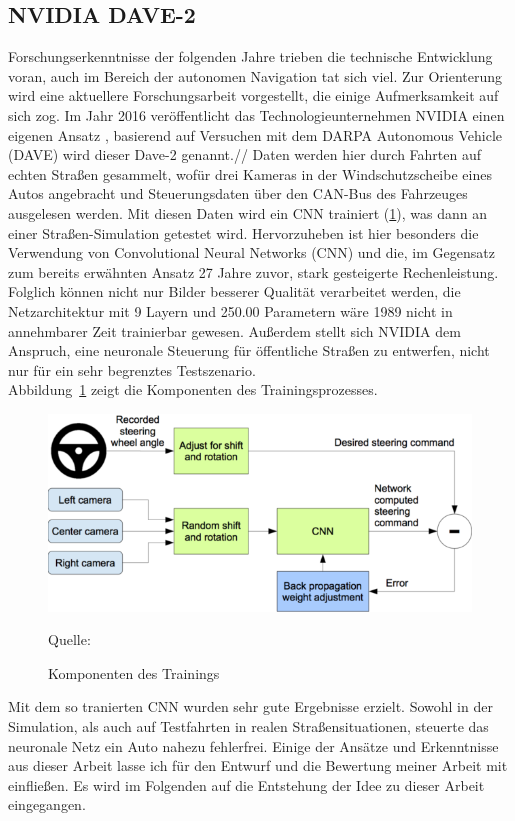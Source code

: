 \subsection{NVIDIA DAVE-2}

Forschungserkenntnisse der folgenden Jahre trieben die technische Entwicklung voran, auch im Bereich der autonomen Navigation tat sich viel. Zur Orienterung wird eine aktuellere Forschungsarbeit vorgestellt, die einige Aufmerksamkeit auf sich zog.
Im Jahr 2016 veröffentlicht das Technologieunternehmen \textsc{NVIDIA} einen eigenen Ansatz \cite{bojarski2016end}, basierend auf Versuchen mit dem \glqq DARPA Autonomous Vehicle \grqq{} (DAVE)  wird dieser \glqq Dave-2 \grqq{} genannt.//
Daten werden hier durch Fahrten auf echten Straßen gesammelt, wofür drei Kameras in der Windschutzscheibe eines Autos angebracht und Steuerungsdaten über den CAN-Bus des Fahrzeuges ausgelesen werden. Mit diesen Daten wird ein CNN trainiert (\ref{img:NVIDIA}), was dann an einer Straßen-Simulation getestet wird. Hervorzuheben ist hier besonders die Verwendung von Convolutional Neural Networks (CNN) und die, im Gegensatz zum bereits erwähnten Ansatz 27 Jahre zuvor, stark gesteigerte Rechenleistung. Folglich können nicht nur Bilder besserer Qualität verarbeitet werden, die Netzarchitektur mit 9 Layern und 250.00 Parametern wäre 1989 nicht in annehmbarer Zeit trainierbar gewesen. Außerdem stellt sich NVIDIA dem Anspruch, eine neuronale Steuerung für öffentliche Straßen zu entwerfen, nicht nur für ein sehr begrenztes Testszenario.\\
Abbildung~\ref{img:NVIDIA} zeigt die Komponenten des Trainingsprozesses. 

\begin{figure}[h]
	\centering
	\includegraphics[scale=0.6]{figures/NVIDIA-Training.png}
	\caption{Komponenten des Trainings}
	Quelle: 
	\label{img:NVIDIA}
\end{figure}

Mit dem so tranierten CNN wurden sehr gute Ergebnisse erzielt. Sowohl in der Simulation, als auch auf Testfahrten in realen Straßensituationen, steuerte das neuronale Netz ein Auto nahezu fehlerfrei.
Einige der Ansätze und Erkenntnisse aus dieser Arbeit lasse ich für den Entwurf und die Bewertung meiner Arbeit mit einfließen. Es wird im Folgenden auf die Entstehung der Idee zu dieser Arbeit eingegangen.



